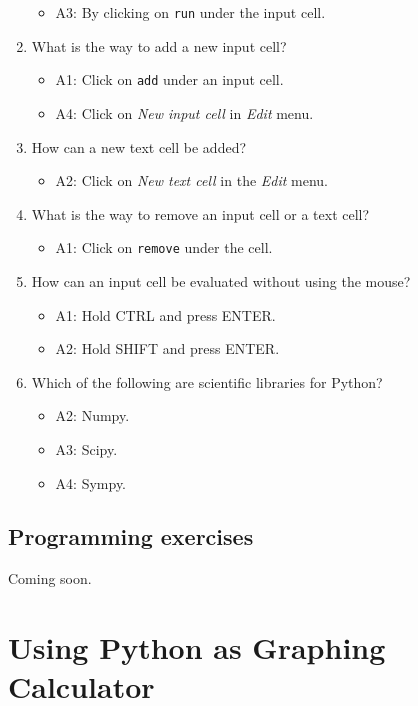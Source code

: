 \documentclass[article,A4,12pt]{llncs}
\begin{document}
\begin{enumerate}
  \begin{itemize}
    \item A3: By clicking on {\tt run} under the input cell.
  \end{itemize}
\item What is the way to add a new input cell?
  \begin{itemize}
    \item A1: Click on {\tt add} under an input cell. 
    \item A4: Click on {\em New input cell} in {\em Edit} menu.
  \end{itemize}
\item How can a new text cell be added?
  \begin{itemize}
    \item A2: Click on {\em New text cell} in the {\em Edit} menu.
  \end{itemize}
\item What is the way to remove an input cell or a text cell?
  \begin{itemize}
    \item A1: Click on {\tt remove} under the cell. 
  \end{itemize}
\item How can an input cell be evaluated without using the mouse?
  \begin{itemize}
    \item A1: Hold CTRL and press ENTER.
    \item A2: Hold SHIFT and press ENTER.
  \end{itemize}
\item Which of the following are scientific libraries for Python?
  \begin{itemize}
    \item A2: Numpy.
    \item A3: Scipy.
    \item A4: Sympy.
  \end{itemize}
\end{enumerate}

\subsection{Programming exercises}

Coming soon.


\section{Using Python as Graphing Calculator}
\end{document}
